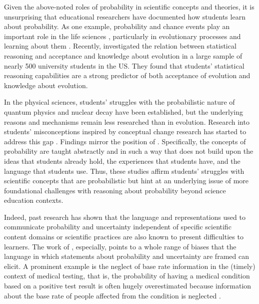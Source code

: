 \documentclass[man]{apa7}
\begin{document}
Given the above-noted roles of probability in scientific concepts and theories, it is unsurprising that educational researchers have documented how students learn about probability. As one example, probability and chance events play an important role in the life sciences \parencite{g03, gk08}, particularly in evolutionary processes and learning about them \parencite{th17}. Recently, \textcite{fsnh19} investigated the relation between statistical reasoning and acceptance and knowledge about evolution in a large sample of nearly 500 university students in the US. They found that students’ statistical reasoning capabilities are a strong predictor of both acceptance of evolution and knowledge about evolution.  

In the physical sciences, students' struggles with the probabilistic nature of quantum physics \parencite{br02} and nuclear decay \parencite{smmv17} have been established, but the underlying reasons and mechanisms remain less researched than in evolution. Research into students’ misconceptions inspired by conceptual change research has started to address this gap \parencite{ms15, alra14, st09}. Findings mirror the position of \textcite{bgv94}. Specifically, the concepts of probability are taught abstractly and in such a way that does not build upon the ideas that students already hold, the experiences that students have, and the language that students use. Thus, these studies affirm students' struggles with scientific concepts that are probabilistic but hint at an underlying issue of more foundational challenges with reasoning about probability beyond science education contexts. 

Indeed, past research has shown that the language and representations used to communicate probability and uncertainty independent of specific scientific content domains or scientific practices are also known to present difficulties to learners. The work of \textcite{tk74}, especially, points to a whole range of biases that the language in which statements about probability and uncertainty are framed can elicit. A prominent example is the neglect of base rate information in the (timely) context of medical testing, that is, the probability of having a medical condition based on a positive test result is often hugely overestimated because information about the base rate of people affected from the condition is neglected \parencite{kahneman_thinking_2012}.
\end{document}
